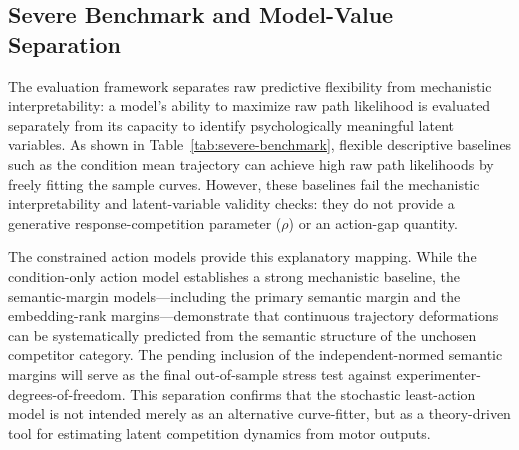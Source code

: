 
\subsection{Severe Benchmark and Model-Value Separation}

The evaluation framework separates raw predictive flexibility from mechanistic interpretability: a model's ability to maximize raw path likelihood is evaluated separately from its capacity to identify psychologically meaningful latent variables. As shown in Table~\ref{tab:severe-benchmark}, flexible descriptive baselines such as the condition mean trajectory can achieve high raw path likelihoods by freely fitting the sample curves. However, these baselines fail the mechanistic interpretability and latent-variable validity checks: they do not provide a generative response-competition parameter ($\rho$) or an action-gap quantity.

The constrained action models provide this explanatory mapping. While the condition-only action model establishes a strong mechanistic baseline, the semantic-margin models—including the primary semantic margin and the embedding-rank margins—demonstrate that continuous trajectory deformations can be systematically predicted from the semantic structure of the unchosen competitor category. The pending inclusion of the independent-normed semantic margins will serve as the final out-of-sample stress test against experimenter-degrees-of-freedom. This separation confirms that the stochastic least-action model is not intended merely as an alternative curve-fitter, but as a theory-driven tool for estimating latent competition dynamics from motor outputs.
